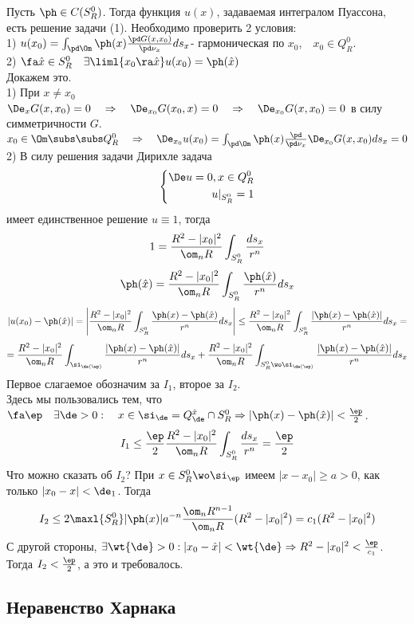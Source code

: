 \documentclass[a4paper,draft]{article}
\begin{document}
Пусть $\ph\in C(S^0_R)$. Тогда функция $u(x)$, задаваемая
интегралом Пуассона, есть решение задачи (1). Необходимо проверить
2 условия:\\
1) $u(x_0)=\int_{\pd\Om}\ph(x)\frac{\pd
G(x,x_0)}{\pd \nu_x}ds_x$- гармоническая по $x_0$,$\quad x_0\in Q^0_R$.\\
2) $\fa \hat{x}\in S^0_R\quad\exists \liml{x_0\ra
\hat{x}}u(x_0)=\ph(\hat{x})$\\
Докажем это.\\
1) При $x\neq x_0$ $\De_xG(x,x_0)=0\quad\Rightarrow\quad
\De_{x_0}G(x_0,x)=0\quad\Rightarrow\quad
\De_{x_0}G(x,x_0)=0$ в силу симметричности $G$.\\
$x_0\in\Om\subs\subs Q^0_R\quad\Rightarrow\quad
\De_{x_0}u(x_0)=\int_{\pd\Om}\ph(x)\frac{\pd}{\pd
\nu_x}\De_{x_0}G(x,x_0)ds_x=0$\\
2) В силу решения задачи Дирихле задача
$$
\left\{
\begin{aligned}
\De u=0, x\in  Q_R^0\\
u|_{S^0_R}=1\\
\end{aligned}
\right.
$$
имеет единственное решение $u\equiv 1$, тогда
$$
1=\frac{R^2-|x_0|^2}{\om_nR}\int_{S_R^0}\frac{ds_x}{r^n}
$$
$$
\ph(\hat{x})=\frac{R^2-|x_0|^2}{\om_nR}\int_{S_R^0}\frac{\ph(\hat{x})}{r^n}ds_x
$$
$$
|u(x_0)-\ph(\hat{x})|=\left|\frac{R^2-|x_0|^2}{\om_nR}\int_{S_R^0}\frac{\ph(x)-\ph(\hat{x})}{r^n}ds_x\right|\le
\frac{R^2-|x_0|^2}{\om_nR}\int_{S_R^0}\frac{|\ph(x)-\ph(\hat{x})|}{r^n}ds_x=
$$
$$
=\frac{R^2-|x_0|^2}{\om_nR}\int_{\si_{\de(\ep)}}\frac{|\ph(x)-\ph(\hat{x})|}{r^n}ds_x+
\frac{R^2-|x_0|^2}{\om_nR}\int_{S_R^0\wo\si_{\de(\ep)}}\frac{|\ph(x)-\ph(\hat{x})|}{r^n}ds_x
$$
Первое слагаемое обозначим за $I_1$, второе за $I_2$.\\
Здесь мы пользовались тем, что $\fa \ep \quad\exists
\de>0:\quad x\in\si_{\de}=Q_{\de}^{\hat{x}}\cap S_R^0
\Rightarrow |\ph(x)-\ph(\hat{x})|<\frac{\ep}{2}$.
$$
I_1\le\frac{\ep}{2}\frac{R^2-|x_0|^2}{\om_nR}\int_{S_R^0}\frac{ds_x}{r^n}=\frac{\ep}{2}
$$
Что можно сказать об $I_2$? При $x\in
S^0_R\wo\si_{\ep}$ имеем $|x-x_0|\ge a>0$, как
только $|x_0-x|<\de_1$. Тогда
$$
I_2\le
2\maxl{S_R^0}|\ph(x)|a^{-n}\frac{\om_nR^{n-1}}{\om_nR}(R^2-|x_0|^2)=c_1(R^2-|x_0|^2)
$$
С другой стороны, $\exists \wt{\de}>0:
|x_0-\hat{x}|<\wt{\de} \Rightarrow
R^2-|x_0|^2<\frac{\ep}{c_1}$. Тогда
$I_2<\frac{\ep}{2}$, а это и требовалось.

\subsection{Неравенство Харнака}
\end{document}
